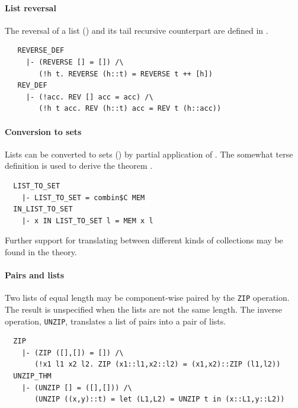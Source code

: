 \paragraph {List reversal}

The reversal of a list () and its tail recursive
counterpart  are defined in .
\begin{hol}
\begin{verbatim}
   REVERSE_DEF
     |- (REVERSE [] = []) /\
        (!h t. REVERSE (h::t) = REVERSE t ++ [h])
   REV_DEF
     |- (!acc. REV [] acc = acc) /\
        (!h t acc. REV (h::t) acc = REV t (h::acc))
\end{verbatim}
\end{hol}

\paragraph {Conversion to sets}

Lists can be converted to sets () by partial
application of . The somewhat terse definition is used to
derive the theorem \ml{IN\_LIST\_TO\_SET}.
%
\begin{hol}
\begin{verbatim}
  LIST_TO_SET
    |- LIST_TO_SET = combin$C MEM
  IN_LIST_TO_SET
    |- x IN LIST_TO_SET l = MEM x l
\end{verbatim}
\end{hol}
%
Further support for translating between different kinds of
collections may be found in the  theory.

\paragraph {Pairs and lists}

Two lists of equal length may be component-wise paired by
the {\small\verb+ZIP+} operation. The result is unspecified
when the lists are not the same length. The inverse operation,
{\small\verb+UNZIP+}, translates a list of pairs into a pair of
lists.
\begin{hol}
\begin{verbatim}
  ZIP
    |- (ZIP ([],[]) = []) /\
       (!x1 l1 x2 l2. ZIP (x1::l1,x2::l2) = (x1,x2)::ZIP (l1,l2))
  UNZIP_THM
    |- (UNZIP [] = ([],[])) /\
       (UNZIP ((x,y)::t) = let (L1,L2) = UNZIP t in (x::L1,y::L2))
\end{verbatim}
\end{hol}

